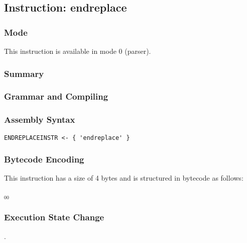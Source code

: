 \subsection{Instruction: endreplace}

\subsubsection{Mode}
This instruction is available in mode 0 (parser).
\subsubsection{Summary}


\subsubsection{Grammar and Compiling}


\subsubsection{Assembly Syntax}

\begin{myquote}
\begin{verbatim}
ENDREPLACEINSTR <- { 'endreplace' }
\end{verbatim}
\end{myquote}

\subsubsection{Bytecode Encoding}

This instruction has a size of 4 bytes and is structured in bytecode as follows:

$_{00}$\ 


\subsubsection{Execution State Change}

.


